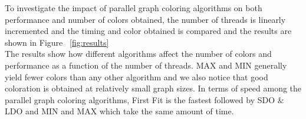 \documentclass[preprint]{sigplanconf}
\begin{document}
To investigate the impact of parallel graph coloring algorithms on  both performance and number of colors obtained, the number of threads is linearly incremented and the timing and color obtained is compared and the results are shown in Figure ~\ref{fig:results}\\

The results show how different algorithms affect the number of colors and performance as a function of the number of threads. MAX and MIN generally yield fewer colors than any other algorithm and we also notice that good coloration is obtained at relatively small graph sizes.
In terms of speed among the parallel graph coloring algorithms, First Fit is the fastest followed by SDO $\&$ LDO and MIN and MAX which take the same amount of time.

%
%
%
%
%
\end{document}
